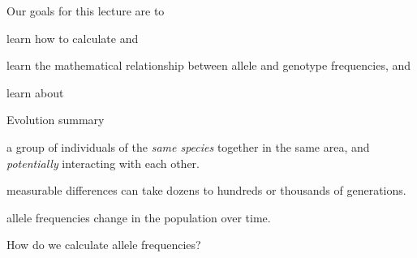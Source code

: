 \documentclass[t]{beamer}
\begin{document}

\begin{frame}{Our goals for this lecture are to}
	
	\hangpara learn how to calculate  and 
	
	\hangpara learn the mathematical relationship between allele and genotype frequencies, and
	
	\hangpara learn about 
	
\end{frame}
%
\begin{frame}[t]{Evolution summary}

	\hangpara {} a group of individuals of the \emph{same species} together in the same area, and \emph{potentially} interacting with each other.
	
	\hangpara {} measurable differences can take dozens to hundreds or thousands of generations.
	
	\hangpara {} allele frequencies change in the population over time.
	
	\pause \hangpara How do we calculate allele frequencies?

\end{frame}
\end{document}
